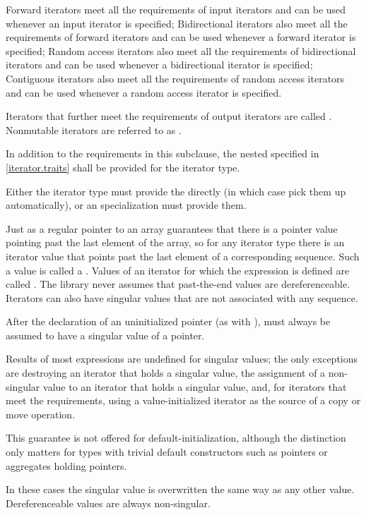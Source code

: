 \pnum
Forward iterators meet all the requirements of input
iterators and can be used whenever
an input iterator is specified;
Bidirectional iterators also meet all the requirements of
forward iterators and can be used whenever a forward iterator is specified;
Random access iterators also meet all the requirements of bidirectional
iterators and can be used whenever a bidirectional iterator is specified;
Contiguous iterators also meet all the requirements of random access
iterators and can be used whenever a random access iterator is specified.

\pnum
Iterators that further meet the requirements of output iterators are
called . Nonmutable iterators are referred to
as .

\pnum
In addition to the requirements in this subclause,
the nested  specified in \ref{iterator.traits}
shall be provided for the iterator type.
\begin{note}
Either the iterator type must provide the  directly
(in which case  pick them up automatically), or
an  specialization must provide them.
\end{note}

\pnum
{}%
%
Just as a regular pointer to an array guarantees that there is a pointer value pointing past the last element
of the array, so for any iterator type there is an iterator value that points past the last element of a
corresponding sequence.
Such a value is called a .
Values of an iterator 
for which the expression  is defined
are called .
The library never assumes that past-the-end values are dereferenceable.
Iterators can also have singular values that are not associated with any
sequence.
\begin{example}
After the declaration of an uninitialized pointer 
(as with ),
 must always be assumed to have a singular value of a pointer.
\end{example}
Results of most expressions are undefined for singular values;
the only exceptions are destroying an iterator that holds a singular value,
the assignment of a non-singular value to
an iterator that holds a singular value, and, for iterators that meet the
 requirements, using a value-initialized iterator
as the source of a copy or move operation.
\begin{note}
This guarantee is not
offered for default-initialization, although the distinction only matters for types
with trivial default constructors such as pointers or aggregates holding pointers.
\end{note}
In these cases the singular
value is overwritten the same way as any other value.
Dereferenceable
values are always non-singular.

